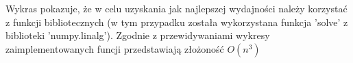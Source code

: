 \documentclass[11pt, a4paper]{article}
\begin{document}
Wykras pokazuje, że w celu uzyskania jak najlepszej wydajności należy korzystać z funkcji bibliotecznych (w tym przypadku została wykorzystana funkcja 'solve' z biblioteki 'numpy.linalg'). Zgodnie z przewidywaniami wykresy zaimplementowanych funcji przedstawiają złożoność \begin{math} O(n^3) \end{math}

 
\end{document}
